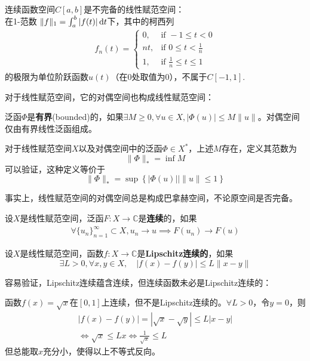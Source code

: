 \begin{example}
    连续函数空间$C[a,b]$是不完备的线性赋范空间：\\
    在1-范数
$\|f\|_1 =\int_{a}^{b}|f(t)|\,\text dt$下，其中的柯西列\begin{align*}
    f_n(t)=\begin{cases}
        0,&\text{if }-1\leq t <0\\
        nt,&\text{if }0\leq t <\frac{1}{n}\\
        1,&\text{if }\frac{1}{n}\leq t \leq 1
    \end{cases}
\end{align*}
的极限为单位阶跃函数$u(t)$（在0处取值为0），不属于$C[-1,1]$.
\end{example}

对于线性赋范空间，它的对偶空间也构成线性赋范空间：
\begin{definition}[对偶空间的范数]
    泛函$\Phi$是\textbf{有界}(bounded)的，如果$\exists M\geq 0,\forall u\in X,|\Phi(u)|\leq M\|u\|$。对偶空间仅由有界线性泛函组成。

    对于线性赋范空间$X$以及对偶空间中的泛函$\Phi\in X^*$，上述$M$存在，定义其范数为
    \[\|\Phi\|_*=\inf M\]
    可以验证，这种定义等价于
    \[\|\Phi\|_*=\sup\left\{|\Phi(u)|\left|\|u\|\leq 1\right.\right\}\]
\end{definition}

事实上，线性赋范空间的对偶空间总是构成巴拿赫空间，不论原空间是否完备。

\begin{definition}[泛函的连续性]
    设$X$是线性赋范空间，泛函$F:X\to\mathbb{C} $是\textbf{连续}的，如果\begin{align*}
        \forall \{u_n\}_{n=1}^{\infty}\subset X,u_n\to u\implies F(u_n)\to F(u)
    \end{align*}
\end{definition}

\begin{definition}[Lipschitz连续]
    设$X$是线性赋范空间，函数$f:X\to \mathbb{C} $是\textbf{Lipschitz连续的}，如果
    $$\exists L>0,\forall x,y\in X,\quad |f(x)-f(y)|\leq L\|x-y\|$$
\end{definition}

容易验证，Lipschitz连续蕴含连续，但连续函数未必是Lipschitz连续的：
\begin{example}
    函数$f(x)=\sqrt{x}$在$[0,1]$上连续，但不是Lipschitz连续的。$\forall L>0$，令$y=0$，则
    \begin{align*}
        |f(x)-f(y)|=|\sqrt{x}-\sqrt{y}|\leq L|x-y|\\
        \iff \sqrt{x}\leq Lx \iff \frac{1}{\sqrt{x}}\leq L
    \end{align*}
    但总能取$x$充分小，使得以上不等式反向。
\end{example}

